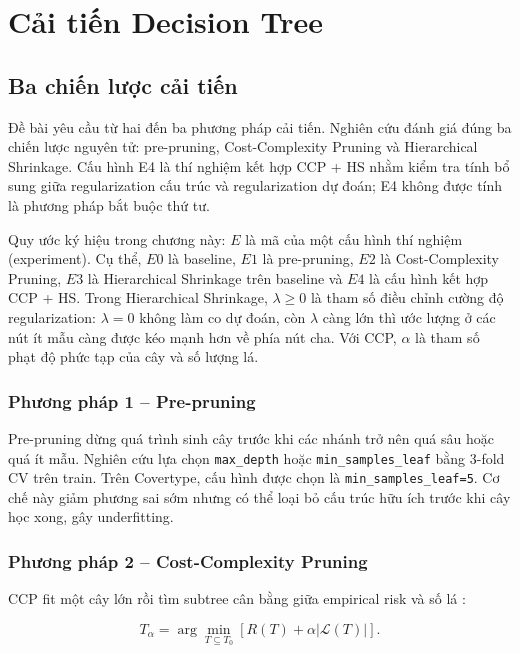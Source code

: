 \chapter{Cải tiến Decision Tree}

\section{Ba chiến lược cải tiến}

Đề bài yêu cầu từ hai đến ba phương pháp cải tiến. Nghiên cứu đánh giá đúng ba chiến lược nguyên tử: pre-pruning, Cost-Complexity Pruning và Hierarchical Shrinkage. Cấu hình E4 là thí nghiệm kết hợp CCP + HS nhằm kiểm tra tính bổ sung giữa regularization cấu trúc và regularization dự đoán; E4 không được tính là phương pháp bắt buộc thứ tư.

Quy ước ký hiệu trong chương này: $E$ là mã của một cấu hình thí nghiệm (experiment). Cụ thể,
$E0$ là baseline, $E1$ là pre-pruning, $E2$ là Cost-Complexity Pruning, $E3$ là
Hierarchical Shrinkage trên baseline và $E4$ là cấu hình kết hợp CCP + HS. Trong
Hierarchical Shrinkage, $\lambda \geq 0$ là tham số điều chỉnh cường độ regularization:
$\lambda=0$ không làm co dự đoán, còn $\lambda$ càng lớn thì ước lượng ở các nút ít mẫu
càng được kéo mạnh hơn về phía nút cha. Với CCP, $\alpha$ là tham số phạt độ phức tạp
của cây và số lượng lá.

\subsection{Phương pháp 1 -- Pre-pruning}

Pre-pruning dừng quá trình sinh cây trước khi các nhánh trở nên quá sâu hoặc quá ít mẫu. Nghiên cứu lựa chọn \texttt{max\_depth} hoặc \texttt{min\_samples\_leaf} bằng 3-fold CV trên train. Trên Covertype, cấu hình được chọn là \texttt{min\_samples\_leaf=5}. Cơ chế này giảm phương sai sớm nhưng có thể loại bỏ cấu trúc hữu ích trước khi cây học xong, gây underfitting.

\subsection{Phương pháp 2 -- Cost-Complexity Pruning}

CCP fit một cây lớn rồi tìm subtree cân bằng giữa empirical risk và số lá \cite{breiman1984cart,sklearnTree}:

\begin{equation}
    T_{\alpha}=\arg\min_{T\subseteq T_0}\left[R(T)+\alpha\lvert\mathcal{L}(T)\rvert\right].
    \label{eq:ccp}
\end{equation}

